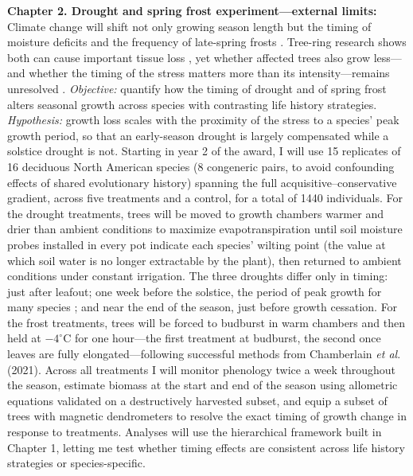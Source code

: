 \documentclass[12pt]{article}
\begin{document}
\textbf{Chapter 2. Drought and spring frost experiment---external limits:}
Climate change will shift not only growing season length but the timing of moisture deficits and the frequency of late-spring frosts \cite{dox_wood_2022}. Tree-ring research shows both can cause important tissue loss \cite{kramer_why_2012,baumgarten_no_2023,dandrea_winters_2019}, yet whether affected trees also grow less---and whether the timing of the stress matters more than its intensity---remains unresolved \cite{chamberlain_late_2021,baumgarten_no_2023,lian_summer_2020,zhang_drought_2021}. \textit{Objective:} quantify how the timing of drought and of spring frost alters seasonal growth across species with contrasting life history strategies. \textit{Hypothesis:} growth loss scales with the proximity of the stress to a species' peak growth period, so that an early-season drought is largely compensated while a solstice drought is not.
Starting in year 2 of the award, I will use 15 replicates of 16 deciduous North American species (8 congeneric pairs, to avoid confounding effects of shared evolutionary history) spanning the full acquisitive--conservative gradient, across five treatments and a control, for a total of 1440 individuals. For the drought treatments, trees will be moved to growth chambers warmer and drier than ambient conditions to maximize evapotranspiration until soil moisture probes installed in every pot indicate each species' wilting point (the value at which soil water is no longer extractable by the plant), then returned to ambient conditions under constant irrigation. The three droughts differ only in timing: just after leafout; one week before the solstice, the period of peak growth for many species \cite{anderson-teixeira_carbon_2021,dorangeville_drought_2018,mcmahon_general_2015}; and near the end of the season, just before growth cessation. For the frost treatments, trees will be forced to budburst in warm chambers and then held at $-4^{\circ}$C for one hour---the first treatment at budburst, the second once leaves are fully elongated---following successful methods from Chamberlain \textit{et al}. (2021). Across all treatments I will monitor phenology twice a week throughout the season, estimate biomass at the start and end of the season using allometric equations validated on a destructively harvested subset, and equip a subset of trees with magnetic dendrometers to resolve the exact timing of growth change in response to treatments. Analyses will use the hierarchical framework built in Chapter 1, letting me test whether timing effects are consistent across life history strategies or species-specific.
\end{document}
